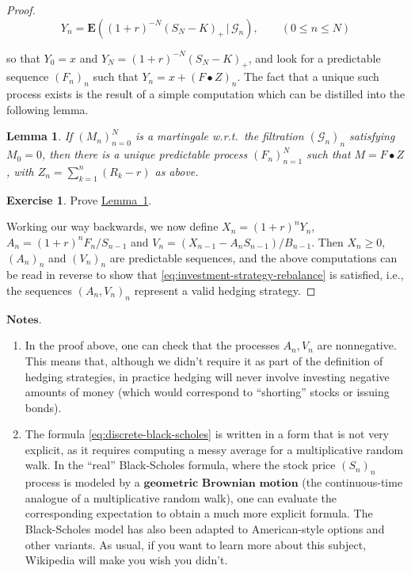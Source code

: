 \documentclass[11pt]{report}
\theoremstyle{plain}
\newtheorem{lem}[thm]{Lemma}
\theoremstyle{definition}
\newtheorem{xexercise}[thm]{Exercise}
\begin{document}
\begin{proof}
\[
Y_n = \mathbf{E}\left((1+r)^{-N}(S_N-K)_+\,|\,\mathcal{G}_n\right), \qquad (0\le n\le N)
\]

\noindent so that $Y_0 = x$ and $Y_N = (1+r)^{-N} (S_N-K)_+$,
and look for a predictable sequence $(F_n)_n$ such
that $Y_n = x + (F\bullet Z)_n$. The fact that a
unique such process exists is the result of a simple
computation which can be distilled into the following
lemma.

\begin{lem}
\label{lem-easy-martingale-rep}
If $(M_n)_{n=0}^N$ is a martingale w.r.t.\ the
filtration $(\mathcal{G}_n)_n$ satisfying $M_0 = 0$,
then there is a unique predictable process
$(F_n)_{n=1}^N$ such that $M = F\bullet Z$, with
$Z_n=\sum_{k=1}^n (R_k-r)$ as above.
\end{lem}

\begin{xexercise}
Prove \hyperref[lem-easy-martingale-rep]{Lemma~\ref*{lem-easy-martingale-rep}}.
\end{xexercise}

\noindent Working our way backwards, we now define
$X_n = (1+r)^n Y_n$, $A_n = (1+r)^n F_n/S_{n-1}$ and
$V_n = (X_{n-1}-A_n S_{n-1})/B_{n-1}$. Then
$X_n\ge 0$, $(A_n)_n$ and $(V_n)_n$ are predictable
sequences, and the above computations can be read in
reverse to show that
\eqref{eq:investment-strategy-rebalance} is satisfied,
i.e., the sequences $(A_n, V_n)_n$ represent a valid
hedging strategy.
\end{proof}

\noindent $\textbf{Notes.}$

\begin{enumerate}[label=\arabic*.]
\item In the proof above, one can check that the processes
$A_n, V_n$ are nonnegative. This means that, although
we didn't require it as part of the definition of
hedging strategies, in practice hedging will never
involve investing negative amounts of money (which
would correspond to ``shorting'' stocks or issuing
bonds).

\item The formula \eqref{eq:discrete-black-scholes} is written
in a form that is not very explicit, as it requires
computing a messy average for a multiplicative random
walk. In the ``real'' Black-Scholes formula, where the
stock price $(S_n)_n$ process is modeled by a
$\textbf{geometric Brownian motion}$ (the
continuous-time analogue of a multiplicative random
walk), one can evaluate the corresponding expectation
to obtain a much more explicit formula. The
Black-Scholes model has also been adapted to
American-style options and other variants. As usual,
if you want to learn more about this subject,
Wikipedia will make you wish you didn't.
\end{enumerate}
\end{document}

